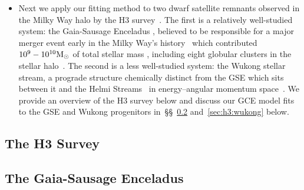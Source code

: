 \documentclass[ms.tex]{subfiles}
\begin{document}
\begin{itemize}

	\item Next we apply our fitting method to two dwarf satellite remnants
	observed in the Milky Way halo by the H3 survey~\citep[survey design:
	][]{Conroy2019}.
	The first is a relatively well-studied system: the Gaia-Sausage Enceladus
	\citep[GSE;][]{Belokurov2018, Helmi2018}, believed to be responsible for
	a major merger event early in the Milky Way's history~\citep{Chaplin2020}
	which contributed~$10^9 - 10^{10} \text{M}_\odot$ of total stellar mass
	\citep{Deason2019, Fattahi2019, Mackereth2019, Vincenzo2019}, including
	eight globular clusters in the stellar halo~\citep{Myeong2018}.
	The second is a less well-studied system: the Wukong stellar stream,
	a prograde structure chemically distinct from the GSE which sits between it
	and the Helmi Streams~\citep{Helmi1999} in energy--angular momentum
	space~\citep{Naidu2020, Naidu2022}.
	We provide an overview of the H3 survey below and discuss our GCE model
	fits to the GSE and Wukong progenitors in~\S\S~\ref{sec:h3:gse}
	and~\ref{sec:h3:wukong} below.

\end{itemize}

\subsection{The H3 Survey}
\label{sec:h3:survey}

\subsection{The Gaia-Sausage Enceladus}
\label{sec:h3:gse}
\end{document}
